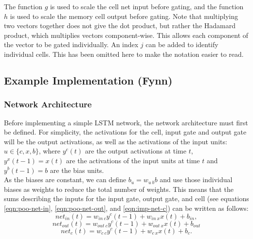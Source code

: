 \documentclass[twoside,a4paper,10pt,DIV=12,BCOR=12mm]{scrartcl}
\begin{document}
The function \begin{math}g\end{math} is used to scale the cell net input before gating, and the function \begin{math}h\end{math} is used to scale the memory cell output before gating.
Note that multiplying two vectors together does not give the dot product, but rather the Hadamard product, which multiplies vectors component-wise.\cite{gokmen2018hadamard} This allows each component of the vector to be gated individually.
An index \begin{math}j\end{math} can be added to identify individual cells. This has been omitted here to make the notation easier to read.\cite{hochreiter1997lstm}

\subsection{Example Implementation (Fynn)}
\subsubsection{Network Architecture}
Before implementing a simple LSTM network, the network architecture must first be defined.
For simplicity, the activations for the cell, input gate and output gate will be the output activations, as well as the activations of the input units:   \begin{math}u\in\{c, x, b \}\end{math}, where \begin{math}y^c(t)\end{math} are the output activations at time \begin{math}t\end{math}, \begin{math}y^x(t-1)=x(t)\end{math} are the activations of the input units at time \begin{math}t\end{math} and \begin{math}y^b(t-1)=b\end{math} are the bias units.\cite{hochreiter1997lstm}\\ 
As the biases are constant, we can define \begin{math}b_u=w_{u\ b}b\end{math} and use those individual biases as weights to reduce the total number of weights.
This means that the sums describing the inputs for the input gate, output gate, and cell  (see equations \ref{eqn:poo-net-in}, \ref{eqn:poo-net-out}, and \ref{eqn:imp-net-c})  can be written as follows:
\begin{equation}
\label{eqn:imp-net-in}
net_{in}(t)=w_{in\ c}y^c(t-1)+w_{in\ x}x(t)+b_{in},
\end{equation}
\begin{equation}
\label{eqn:imp-net-out}
net_{out}(t)=w_{out\ c}y^c(t-1)+w_{out\ x}x(t)+b_{out}
\end{equation}
\begin{equation}
\label{eqn:imp-net-c}
net_c(t)=w_{c\ c}y^c(t-1)+w_{c\ x}x(t)+b_c.
\end{equation}
\end{document}
